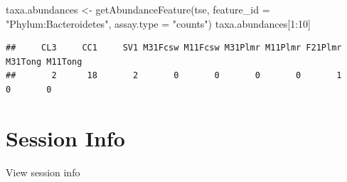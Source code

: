 \documentclass[
]{book}
\newenvironment{Shaded}{\begin{snugshade}}{\end{snugshade}}
\newcommand{\AttributeTok}[1]{\textcolor[rgb]{0.77,0.63,0.00}{#1}}
\newcommand{\DecValTok}[1]{\textcolor[rgb]{0.00,0.00,0.81}{#1}}
\newcommand{\FunctionTok}[1]{\textcolor[rgb]{0.00,0.00,0.00}{#1}}
\newcommand{\NormalTok}[1]{#1}
\newcommand{\OtherTok}[1]{\textcolor[rgb]{0.56,0.35,0.01}{#1}}
\newcommand{\SpecialCharTok}[1]{\textcolor[rgb]{0.00,0.00,0.00}{#1}}
\newcommand{\StringTok}[1]{\textcolor[rgb]{0.31,0.60,0.02}{#1}}
\begin{document}
\begin{Shaded}
\begin{Highlighting}[]
\NormalTok{taxa.abundances }\OtherTok{\textless{}{-}} \FunctionTok{getAbundanceFeature}\NormalTok{(tse, }
                                      \AttributeTok{feature\_id =} \StringTok{"Phylum:Bacteroidetes"}\NormalTok{,}
                                      \AttributeTok{assay.type =} \StringTok{"counts"}\NormalTok{)}
\NormalTok{taxa.abundances[}\DecValTok{1}\SpecialCharTok{:}\DecValTok{10}\NormalTok{]}
\end{Highlighting}
\end{Shaded}

\begin{verbatim}
##     CL3     CC1     SV1 M31Fcsw M11Fcsw M31Plmr M11Plmr F21Plmr M31Tong M11Tong 
##       2      18       2       0       0       0       0       1       0       0
\end{verbatim}

\hypertarget{session-info-3}{%
\section*{Session Info}\label{session-info-3}}

View session info
\end{document}
